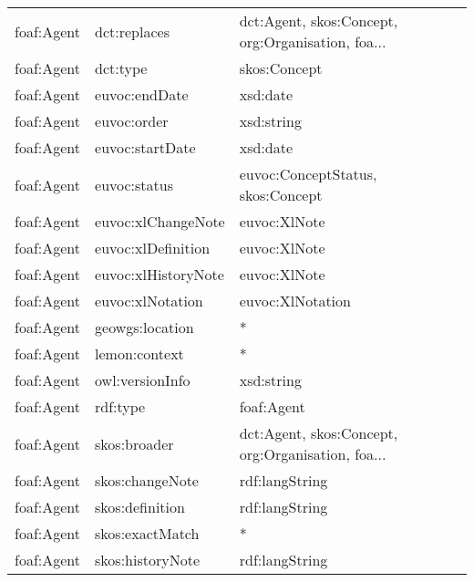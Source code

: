 \documentclass[10pt,a4paper,titlepage,final]{article}
\begin{document}
\begin{longtable}{lll}
          foaf:Agent &            dct:replaces &  dct:Agent, skos:Concept, org:Organisation, foa... \\
          foaf:Agent &                dct:type &                                       skos:Concept \\
          foaf:Agent &           euvoc:endDate &                                           xsd:date \\
          foaf:Agent &             euvoc:order &                                         xsd:string \\
          foaf:Agent &         euvoc:startDate &                                           xsd:date \\
          foaf:Agent &            euvoc:status &                  euvoc:ConceptStatus, skos:Concept \\
          foaf:Agent &      euvoc:xlChangeNote &                                       euvoc:XlNote \\
          foaf:Agent &      euvoc:xlDefinition &                                       euvoc:XlNote \\
          foaf:Agent &     euvoc:xlHistoryNote &                                       euvoc:XlNote \\
          foaf:Agent &        euvoc:xlNotation &                                   euvoc:XlNotation \\
          foaf:Agent &         geowgs:location &                                                  * \\
          foaf:Agent &           lemon:context &                                                  * \\
          foaf:Agent &         owl:versionInfo &                                         xsd:string \\
          foaf:Agent &                rdf:type &                                         foaf:Agent \\
          foaf:Agent &            skos:broader &  dct:Agent, skos:Concept, org:Organisation, foa... \\
          foaf:Agent &         skos:changeNote &                                     rdf:langString \\
          foaf:Agent &         skos:definition &                                     rdf:langString \\
          foaf:Agent &         skos:exactMatch &                                                  * \\
          foaf:Agent &        skos:historyNote &                                     rdf:langString \\

\end{longtable}
\end{document}
